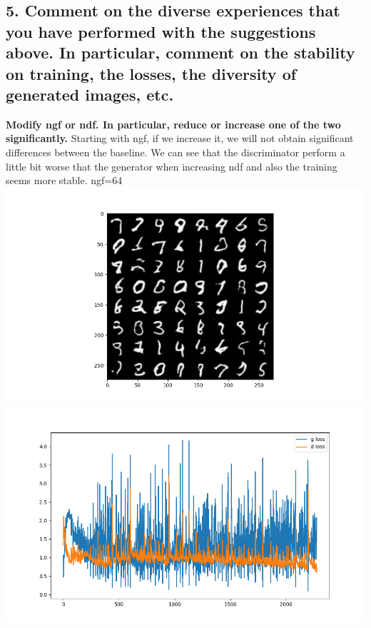 \hypertarget{comment-on-the-diverse-experiences-that-you-have-performed-with-the-suggestions-above.-in-particular-comment-on-the-stability-on-training-the-losses-the-diversity-of-generated-images-etc.}{%
\subsection{5. Comment on the diverse experiences that you have
performed with the suggestions above. In particular, comment on the
stability on training, the losses, the diversity of generated images,
etc.}\label{comment-on-the-diverse-experiences-that-you-have-performed-with-the-suggestions-above.-in-particular-comment-on-the-stability-on-training-the-losses-the-diversity-of-generated-images-etc.}}

\textbf{Modify ngf or ndf. In particular, reduce or increase one of the
two significantly.} Starting with ngf, if we increase it, we will not
obtain significant differences between the baseline. We can see that the
discriminator perform a little bit worse that the generator when
increasing ndf and also the training seems more stable. ngf=64
\includegraphics{./images/Pasted image 20231228113811.png}\includegraphics{./images/Pasted image 20231228113841.png}
